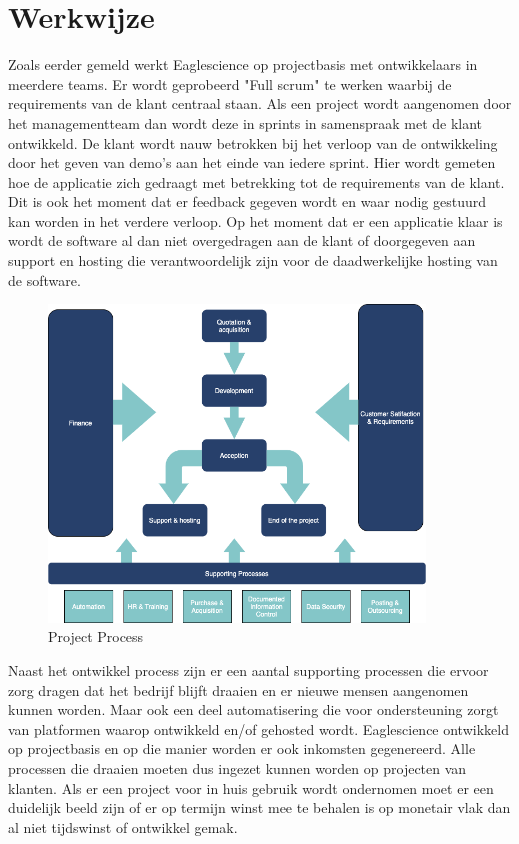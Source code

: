 \section{Werkwijze}\label{sec:werkwijze}
Zoals eerder gemeld werkt Eaglescience op projectbasis met ontwikkelaars in meerdere teams. Er wordt geprobeerd "Full scrum" te werken waarbij de requirements van de klant centraal staan. Als een project wordt aangenomen door het managementteam dan wordt deze in sprints in samenspraak met de klant ontwikkeld. De klant wordt nauw betrokken bij het verloop van de ontwikkeling door het geven van demo's aan het einde van iedere sprint. Hier wordt gemeten hoe de applicatie zich gedraagt met betrekking tot de requirements van de klant. Dit is ook het moment dat er feedback gegeven wordt en waar nodig gestuurd kan worden in het verdere verloop. Op het moment dat er een applicatie klaar is wordt de software al dan niet overgedragen aan de klant of doorgegeven aan support en hosting die verantwoordelijk zijn voor de daadwerkelijke hosting van de software.

\begin{figure}[bth]
\myfloatalign
\includegraphics[width=10cm]{gfx/ProcessFlow}
\caption{Project Process}
\label{fig:Project Process}
\end{figure}

Naast het ontwikkel process zijn er een aantal supporting processen die ervoor zorg dragen dat het bedrijf blijft draaien en er nieuwe mensen aangenomen kunnen worden. Maar ook een deel automatisering die voor ondersteuning zorgt van platformen waarop ontwikkeld en/of gehosted wordt.  Eaglescience ontwikkeld op projectbasis en op die manier worden er ook inkomsten gegenereerd. Alle processen die draaien moeten dus ingezet kunnen worden op projecten van klanten. Als er een project voor in huis gebruik wordt ondernomen moet er een duidelijk beeld zijn of er op termijn winst mee te behalen is op monetair vlak dan al niet tijdswinst of ontwikkel gemak.

